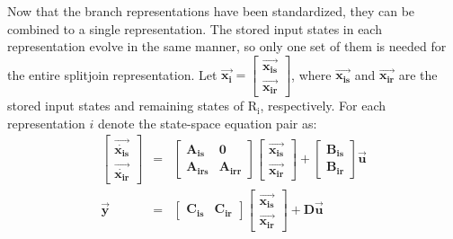     Now that the branch representations have been standardized,
they can be combined to a single representation. The stored input
states in each representation evolve in the same manner, so only
one set of them is needed for the entire splitjoin representation.
Let $\vec{\mathbf{x_i}} = \left [ \begin{array} {c}
\vec{\mathbf{x_{is}}} \\ \vec{\mathbf{x_{ir}}} \end{array} \right
]$, where $\vec{\mathbf{x_{is}}}$ and $\vec{\mathbf{x_{ir}}}$ are
the stored input states and remaining states of $\mathrm{R_i}$,
respectively. For each representation $i$ denote the state-space
equation pair as:
\begin{eqnarray*}
\left [ \begin{array} {c} \vec{\dot{\mathbf{x_{is}}}} \\
\vec{\dot{\mathbf{x_{ir}}}} \end{array} \right ] & = & \left [
\begin{array} {cc} \mathbf{A_{is}} & \mathbf{0} \\
\mathbf{A_{irs}} & \mathbf{A_{irr}} \end{array} \right ] \left [
\begin{array} {c} \vec{\mathbf{x_{is}}} \\ \vec{\mathbf{x_{ir}}}
\end{array} \right ] +  \left [ \begin{array} {c} \mathbf{B_{is}}
\\ \mathbf{B_{ir}} \end{array} \right ] \vec{\mathbf{u}} \\
\vec{\mathbf{y}} & = & \left [ \begin{array} {cc} \mathbf{C_{is}}
& \mathbf{C_{ir}} \end{array} \right ] \left [ \begin{array} {c}
\vec{\mathbf{x_{is}}} \\ \vec{\mathbf{x_{ir}}} \end{array} \right
] + \mathbf{D} \vec{\mathbf{u}}
\end{eqnarray*}

